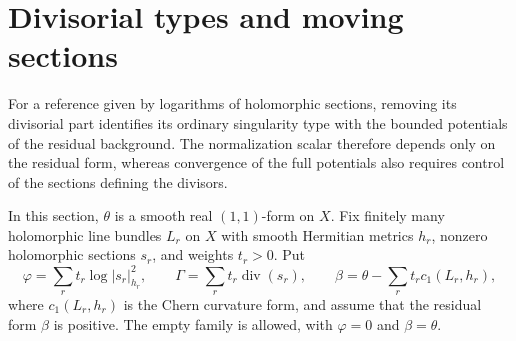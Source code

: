 \section{Divisorial types and moving sections}\label{sec:divisorial-normalization-stability}

For a reference given by logarithms of holomorphic sections, removing its divisorial part identifies its ordinary singularity type with the bounded potentials of the residual background. The normalization scalar therefore depends only on the residual form, whereas convergence of the full potentials also requires control of the sections defining the divisors.

In this section, $\theta$ is a smooth real $(1,1)$-form on $X$. Fix finitely many holomorphic line bundles $L_r$ on $X$ with smooth Hermitian metrics $h_r$, nonzero holomorphic sections $s_r$, and weights $t_r>0$. Put
\[
 \varphi=\sum_r t_r\log|s_r|_{h_r}^2,\qquad
 \Gamma=\sum_r t_r\operatorname{div}(s_r),\qquad
 \beta=\theta-\sum_r t_rc_1(L_r,h_r),
\]
where $c_1(L_r,h_r)$ is the Chern curvature form, and assume that the residual form $\beta$ is positive. The empty family is allowed, with $\varphi=0$ and $\beta=\theta$.

